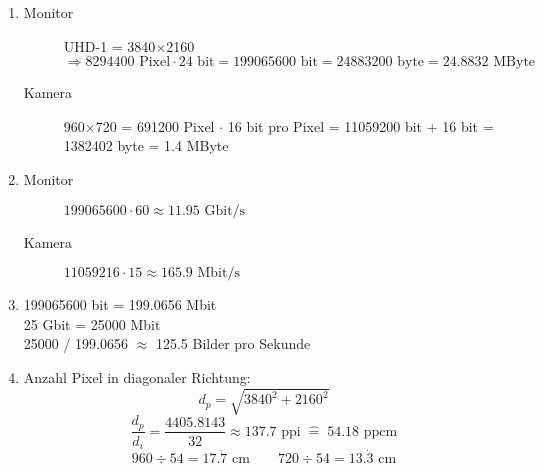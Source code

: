 \documentclass[a4paper, 12pt, margins=2cm]{homework}
\begin{document}
  \begin{problem}
  \end{problem}
  \begin{solution}\hfill
    \begin{enumerate}[label=(\alph*)]\itemsep0pt
      \item 
        \begin{description}
          \item[Monitor] 
            UHD-1 = 3840$\times$2160 $\Longrightarrow 8294400\text{ Pixel}\cdot 24\text{ bit} = 199065600\text{ bit} = 24883200\text{ byte} = 24.8832\text{ MByte}$
          \item[Kamera] 
            960$\times$720 = 691200 Pixel $\cdot $ 16 bit pro Pixel = 11059200 bit + 16 bit = 1382402 byte = 1.4 MByte
        \end{description}

      \item 
        \begin{description}
          \item[Monitor]
            $199065600\cdot 60\approx 11.95\text{ Gbit/s}$
          \item[Kamera]
            $11059216\cdot 15\approx 165.9\text{ Mbit/s}$
        \end{description}

      \item 199065600 bit = 199.0656 Mbit\\
            25 Gbit = 25000 Mbit\\
            25000 / 199.0656 $\approx$ 125.5 Bilder pro Sekunde

      \item Anzahl Pixel in diagonaler Richtung:
              \[ d_p = \sqrt{3840^2 + 2160^2} \]
              \[ \frac{d_p}{d_i} = \frac{4405.8143}{32}\approx 137.7\text{ ppi}\;\widehat{=}\; 54.18\text{ ppcm} \]
              \[ 960\div 54 = 17.\dot{7}\text{ cm}\qquad 720\div 54 = 13.\dot{3}\text{ cm} \]
    \end{enumerate}
    
  \end{solution}

\newpage
\end{document}
